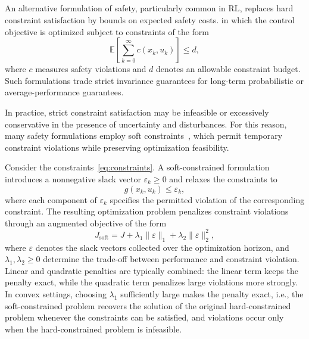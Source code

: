 \subsection{\texorpdfstring{}{Relaxed Safety Formulations}}
An alternative formulation of safety, particularly common in \ac{RL}, replaces hard constraint satisfaction by bounds on expected safety costs.  in which the control objective is optimized subject to constraints of the form
\[
	\mathbb E\!\left[\sum_{k=0}^{\infty} c(x_k,u_k)\right]
	\le d ,
\]
where $c$ measures safety violations and $d$ denotes an allowable constraint budget. Such formulations trade strict invariance guarantees for long-term probabilistic or average-performance guarantees.

In practice, strict constraint satisfaction may be infeasible or excessively conservative in the presence of uncertainty and disturbances. For this reason, many safety formulations employ soft constraints~\cite{nocedal2006numerical}, which permit temporary constraint violations while preserving optimization feasibility.

Consider the constraints~\eqref{eq:constraints}. A soft-constrained formulation introduces a nonnegative slack vector $\varepsilon_k \geq 0$ and relaxes the constraints to
\[
	g(x_k, u_k) \leq \varepsilon_k ,
\]
where each component of $\varepsilon_k$ specifies the permitted violation of the corresponding constraint. The resulting optimization problem  penalizes constraint violations through an augmented objective of the form
\[
	J_{\mathrm{soft}}
	=
	J
	+
	\lambda_1 \|\varepsilon\|_1
	+
	\lambda_2 \|\varepsilon\|_2^2 ,
\]
where $\varepsilon$ denotes  the slack vectors collected over the optimization horizon, and $\lambda_1, \lambda_2 \ge 0$ determine the trade-off between performance and constraint violation. Linear and quadratic penalties are typically combined: the linear term keeps the penalty exact, while the quadratic term penalizes large violations more strongly. In convex settings, choosing $\lambda_1$ sufficiently large makes the penalty exact, i.e., the soft-constrained problem recovers the solution of the original hard-constrained problem whenever the constraints can be satisfied, and violations occur only when the hard-constrained problem is infeasible. \\



